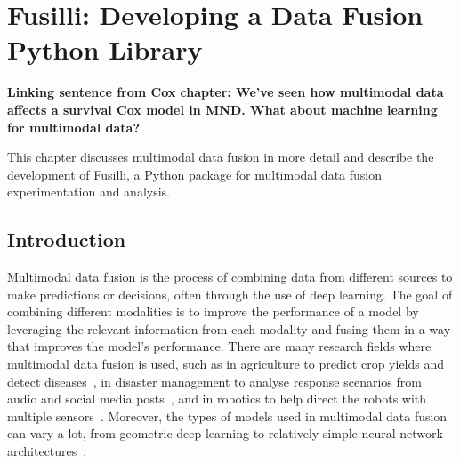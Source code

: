 \chapter{Fusilli: Developing a Data Fusion Python Library}
\label{fusilli_development}

\textbf{Linking sentence from Cox chapter:
We've seen how multimodal data affects a survival Cox model in MND.
What about machine learning for multimodal data?}

This chapter discusses multimodal data fusion in more detail and describe the development of Fusilli, a Python package for multimodal data fusion experimentation and analysis.

\section{Introduction}

Multimodal data fusion is the process of combining data from different sources to make predictions or decisions, often through the use of deep learning.
The goal of combining different modalities is to improve the performance of a model by leveraging the relevant information from each modality and fusing them in a way that improves the model's performance.
There are many research fields where multimodal data fusion is used, such as in agriculture to predict crop yields and detect diseases~\cite{s.s.gopiMultimodalMachineLearning2023, patilRiceFusionMultimodalityData2022}, in disaster management to analyse response scenarios from audio and social media posts~\cite{algiriyageMultisourceMultimodalData2021}, and in robotics to help direct the robots with multiple sensors~\cite{duanMultimodalSensorsMLBased2022}.
Moreover, the types of models used in multimodal data fusion can vary a lot, from geometric deep learning to relatively simple neural network architectures~\cite{cuiDeepMultimodalFusion2022}.


